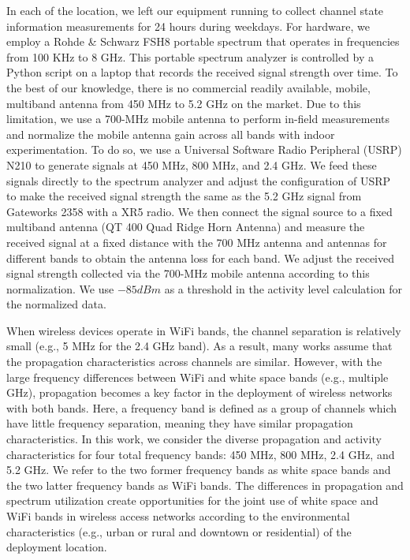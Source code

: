 In each of the location, we left our equipment running to collect channel state information measurements for 24 hours during weekdays. 
For hardware, we employ a Rohde \& Schwarz FSH8 portable spectrum that operates in frequencies from 100 KHz to 8 GHz. 
This portable spectrum analyzer is controlled by a Python script on a laptop that records the received signal strength over time.
To the best of our knowledge, there is no commercial readily available, mobile, multiband antenna from 450 MHz to 5.2 GHz on the market. 
Due to this limitation, we use a 700-MHz mobile antenna to perform in-field measurements and normalize the mobile antenna gain across all bands with indoor experimentation. 
To do so, we use a Universal Software Radio Peripheral (USRP) N210 to generate signals at 450 MHz, 800 MHz, and 2.4 GHz. 
We feed these signals directly to the spectrum analyzer and adjust the configuration of USRP to make the received signal strength the same as the 5.2 GHz signal from Gateworks 2358 with a XR5 radio. 
We then connect the signal source to a fixed multiband antenna (QT 400 Quad Ridge Horn Antenna) and measure the received signal at a fixed distance with the 700 MHz antenna and antennas for different bands to obtain the antenna loss for each band. 
We adjust the received signal strength collected via the 700-MHz mobile antenna according to this normalization.
We use $-85 dBm$ as a threshold in the activity level calculation for the normalized data.

When wireless devices operate in WiFi bands, the channel separation is relatively 
small (e.g., 5 MHz for the 2.4 GHz band). As a result, many works assume that
the propagation characteristics across channels are similar. However, with the
large frequency differences between WiFi and white space bands (e.g., multiple GHz),
propagation becomes a key factor in the deployment of wireless networks with both bands.
Here, a frequency band is defined as a group of channels which have
little frequency separation, meaning they have similar propagation characteristics.
In this work, we consider the diverse propagation and activity characteristics
for four total frequency bands: 450 MHz, 800 MHz, 2.4 GHz, and 5.2 GHz.
We refer to the two former frequency bands as white space bands and
the two latter frequency bands as WiFi bands.
The differences in propagation and spectrum utilization create opportunities
for the joint use of white space and WiFi bands in wireless access networks according
to the environmental characteristics (e.g., urban or rural and downtown or residential)
of the deployment location.



